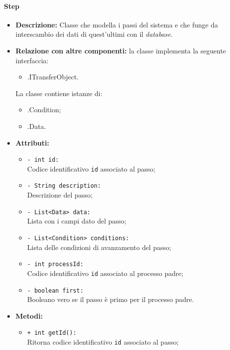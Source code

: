 \paragraph{Step}
\label{botstep}
\begin{flushleft}
\begin{itemize}
\item \textbf{Descrizione:} Classe che modella i passi del sistema e che funge da interscambio dei dati di quest'ultimi con il \textit{database}.
\item \textbf{Relazione con altre componenti:} la classe implementa la seguente interfaccia:
		\begin{itemize}
			\item \smodel{}.ITransferObject.
		\end{itemize}
		La classe contiene istanze di:
		\begin{itemize}
			\item \smodel{}.Condition;
			\item \smodel{}.Data.
		\end{itemize}
\item \textbf{Attributi:}
\begin{sloppypar}
\begin{itemize}
\item \texttt{- int id:}\\ Codice identificativo \texttt{id} associato al passo;
\item \texttt{- String description:}\\ Descrizione del passo;
\item \texttt{- List<Data> data:}\\ Lista con i campi dato del passo;
\item \texttt{- List<Condition> conditions:}\\ Lista delle condizioni di avanzamento del passo;
\item \texttt{- int processId:}\\ Codice identificativo \texttt{id} associato al processo padre;
\item \texttt{- boolean first:}\\ Booleano vero se il passo è primo per il processo padre.
\end{itemize}
\end{sloppypar}
\item \textbf{Metodi:}
\begin{sloppypar}
\begin{itemize}
\item \texttt{+ int getId():}\\ Ritorna codice identificativo \texttt{id} associato al passo;

\end{itemize}
\end{sloppypar}
\end{itemize}
\end{flushleft}
